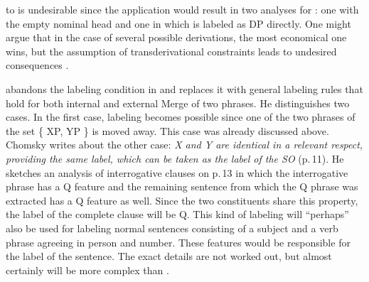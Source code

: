  to  is undesirable since the application would result in
two analyses for : one with the empty nominal head and one in which
 is labeled as DP directly. One might argue that in the case of several possible derivations, the most
economical one wins, but the assumption of transderivational constraints leads to undesired
consequences \citep[Section~5]{Pullum2013a}.

\citet{Chomsky2013a} abandons the labeling condition in  and replaces it with general
labeling rules that hold for both internal and external Merge of two phrases. He distinguishes two
cases. In the first case, labeling becomes possible since one of the two phrases of the set \{ XP,
YP \} is moved away. This case was already discussed above. Chomsky writes about the other case: \emph{X and Y are identical in a relevant respect, providing the same label, which can be
  taken as the label of the SO} (p.\,11). He sketches an analysis of interrogative clauses on
  p.\,13 in which the interrogative phrase has a Q feature and the remaining sentence from which the
  Q phrase was extracted has a Q feature as well. Since the two constituents share this property, the
  label of the complete clause will be Q. This kind of labeling will ``perhaps'' also be used for
  labeling normal sentences consisting of a subject and a verb phrase agreeing in person and
  number. These features would be responsible for the label of the sentence. The exact details are
  not worked out, but almost certainly will be more complex than .

